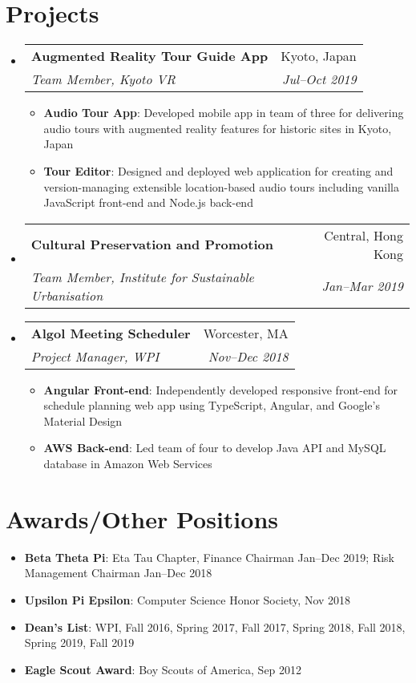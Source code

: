 \documentclass[letterpaper,11pt]{article}
\makeatletter
\newcommand{\resumeItem}[2]{
  \item\small{
    \textbf{#1}{: #2 \vspace{-2pt}}
  }
}
\newcommand{\resumeSubheading}[4]{
  \vspace{-1pt}\item
    \begin{tabular*}{0.97\textwidth}{l@{\extracolsep{\fill}}r}
      \textbf{#1} & #2 \\
      \textit{\small#3} & \textit{\small #4} \\
    \end{tabular*}\vspace{-5pt}
}
\newcommand{\resumeSubItem}[2]{\resumeItem{#1}{#2}\vspace{-4pt}}
\newcommand{\resumeSubHeadingListStart}{\begin{itemize}[leftmargin=*]}
\newcommand{\resumeSubHeadingListEnd}{\end{itemize}}
\newcommand{\resumeItemListStart}{\begin{itemize}}
\newcommand{\resumeItemListEnd}{\end{itemize}\vspace{-5pt}}
\makeatother
\begin{document}
\section{Projects}
  \resumeSubHeadingListStart
    \resumeSubheading
	{Augmented Reality Tour Guide App}{Kyoto, Japan}
	{Team Member, Kyoto VR}{Jul--Oct 2019}
	\resumeItemListStart
	  \resumeItem{Audio Tour App}{Developed mobile app in team of three for
		  delivering audio tours with augmented reality features for historic
		  sites in Kyoto, Japan}
	  \resumeItem{Tour Editor}{Designed and deployed web application for
		  creating and version-managing extensible location-based audio tours
		  including vanilla JavaScript front-end and Node.js back-end}
	\resumeItemListEnd

    \resumeSubheading
	{Cultural Preservation and Promotion}{Central, Hong Kong}
    {Team Member, Institute for Sustainable Urbanisation}{Jan--Mar 2019}

    \resumeSubheading
    {Algol Meeting Scheduler}{Worcester, MA}
    {Project Manager, WPI}{Nov--Dec 2018}
    \resumeItemListStart
      \resumeItem{Angular Front-end}
        {Independently developed responsive front-end for schedule planning web app using TypeScript, Angular, and Google's Material Design}
      \resumeItem{AWS Back-end}
        {Led team of four to develop Java API and MySQL database in Amazon Web Services}
    \resumeItemListEnd
  \resumeSubHeadingListEnd



\section{Awards/Other Positions}
  \resumeSubHeadingListStart
    \resumeSubItem{Beta Theta Pi}
	  {Eta Tau Chapter, Finance Chairman Jan--Dec 2019; Risk Management Chairman
		  Jan--Dec 2018}
    \resumeSubItem{Upsilon Pi Epsilon}
      {Computer Science Honor Society, Nov 2018}
    \resumeSubItem{Dean's List}
      {WPI, Fall 2016, Spring 2017, Fall 2017, Spring 2018, Fall 2018, Spring
		  2019, Fall 2019}
    \resumeSubItem{Eagle Scout Award}
      {Boy Scouts of America, Sep 2012}
  \resumeSubHeadingListEnd

\end{document}
